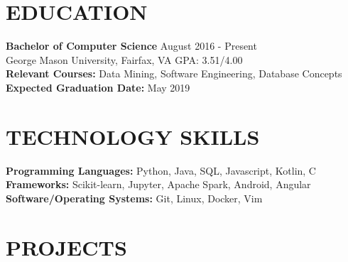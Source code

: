 \documentclass[11pt]{res} %
\begin{document}
\begin{resume}
\vspace{-15pt}
\noindent\makebox[\linewidth]{\rule{\textwidth}{1pt}}


\vspace{-10pt}\section{EDUCATION} \smallskip

\textbf{Bachelor of Computer Science}  \hfill August 2016 - Present\\
\medskip
George Mason University, Fairfax, VA \hfill GPA: 3.51/4.00\\
\textbf{Relevant Courses:} Data Mining, Software Engineering, Database Concepts\\
\textbf{Expected Graduation Date:} May 2019

\vspace{-15pt}
\noindent\makebox[\linewidth]{\rule{\textwidth}{1pt}}


\vspace{-10pt}\section{TECHNOLOGY SKILLS} \smallskip

\textbf{Programming Languages:} Python, Java, SQL, Javascript, Kotlin, C \smallskip\\
\textbf{Frameworks:} Scikit-learn, Jupyter, Apache Spark, Android, Angular \smallskip\\
\textbf{Software/Operating Systems:} Git, Linux, Docker, Vim

\vspace{-15pt}
\noindent\makebox[\linewidth]{\rule{\textwidth}{1pt}}


\vspace{-10pt}\section{PROJECTS} \smallskip


\end{resume}
\end{document}
